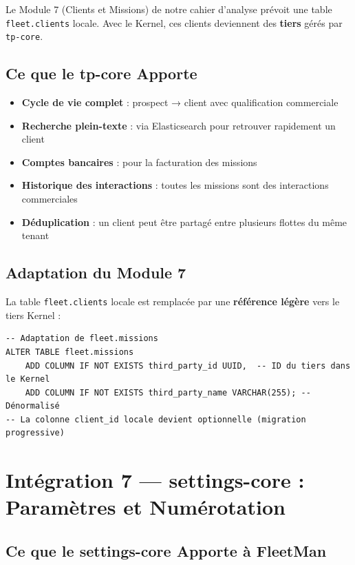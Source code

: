 \documentclass[12pt,a4paper]{report}
\begin{document}
Le Module 7 (Clients et Missions) de notre cahier d'analyse prévoit une table \texttt{fleet.clients} locale. Avec le Kernel, ces clients deviennent des \textbf{tiers} gérés par \texttt{tp-core}.

\subsection{Ce que le tp-core Apporte}

\begin{itemize}[leftmargin=2cm]
  \item \textbf{Cycle de vie complet} : prospect → client avec qualification commerciale
  \item \textbf{Recherche plein-texte} : via Elasticsearch pour retrouver rapidement un client
  \item \textbf{Comptes bancaires} : pour la facturation des missions
  \item \textbf{Historique des interactions} : toutes les missions sont des interactions commerciales
  \item \textbf{Déduplication} : un client peut être partagé entre plusieurs flottes du même tenant
\end{itemize}

\subsection{Adaptation du Module 7}

La table \texttt{fleet.clients} locale est remplacée par une \textbf{référence légère} vers le tiers Kernel :

\begin{lstlisting}[style=javaStyle, caption={Adaptation de la table missions avec référence tiers Kernel}]
-- Adaptation de fleet.missions
ALTER TABLE fleet.missions
    ADD COLUMN IF NOT EXISTS third_party_id UUID,  -- ID du tiers dans le Kernel
    ADD COLUMN IF NOT EXISTS third_party_name VARCHAR(255); -- Dénormalisé
-- La colonne client_id locale devient optionnelle (migration progressive)
\end{lstlisting}

\section{Intégration 7 — settings-core : Paramètres et Numérotation}

\subsection{Ce que le settings-core Apporte à FleetMan}
\end{document}
